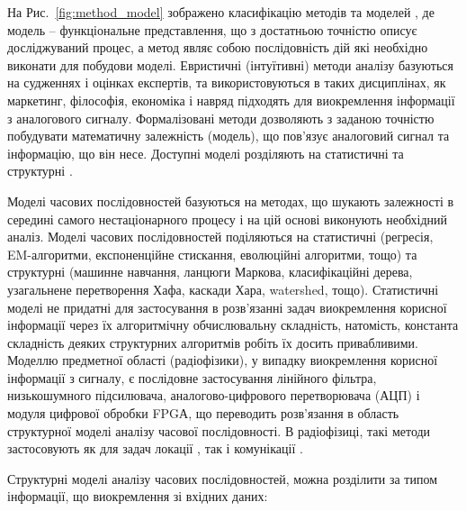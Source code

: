 На Рис.~\ref{fig:method_model} зображено класифікацію методів та моделей 
\cite{imp:Chuchueva2012}, де модель -- функціональне представлення, що з 
достатньою точністю описує досліджуваний процес, а метод являє собою 
послідовність дій які необхідно виконати для побудови моделі. Евристичні 
(інтуїтивні) методи аналізу базуються на судженнях і оцінках експертів, 
та використовуються в таких дисциплінах, як маркетинг, філософія, економіка 
і навряд підходять для виокремлення інформації з аналогового 
сигналу. Формалізовані методи дозволяють з заданою точністю побудувати 
математичну залежність (модель), що пов'язує аналоговий сигнал та інформацію, 
що він несе. Доступні моделі розділяють на статистичні та структурні 
\cite{imp:Chuchueva2012}.

Моделі часових послідовностей базуються на методах, що шукають залежності
в середині самого нестаціонарного процесу і на цій основі виконують 
необхідний аналіз. Моделі часових послідовностей поділяються на статистичні
(регресія, EM-алгоритми, експоненційне стискання, еволюційні алгоритми, тощо)
та структурні (машинне навчання, ланцюги Маркова, класифікаційні дерева, 
узагальнене перетворення Хафа, каскади Хара, watershed, тощо). Статистичні 
моделі не придатні для застосування в розв'язанні задач виокремлення корисної 
інформації через їх алгоритмічну обчислювальну складність, натомість, 
константа складність деяких структурних алгоритмів робіть їх досить 
привабливими. Моделлю предметної області (радіофізики), у випадку виокремлення 
корисної інформації з сигналу, є послідовне застосування лінійного фільтра, 
низькошумного підсилювача, аналогово-цифрового перетворювача (АЦП) і модуля 
цифрової обробки FPGА, що переводить розв'язання в область структурної моделі
аналізу часової послідовності. В радіофізиці, такі методи застосовують як 
для задач локації \cite{imp:Dumin2017}, так і комунікації \cite{imp:Taok2009}.

Структурні моделі аналізу часових послідовностей, можна розділити за типом
інформації, що виокремлення зі вхідних даних:

